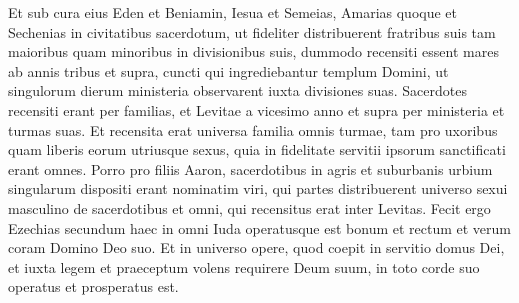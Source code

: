 \begin{biblechapter}
\verse Et sub cura eius Eden et Beniamin, Iesua et Semeias, Amarias quoque et Sechenias in civitatibus sacerdotum, ut fideliter distribuerent fratribus suis tam maioribus quam minoribus in divisionibus suis, 
\verse dummodo recensiti essent mares ab annis tribus et supra, cuncti qui ingrediebantur templum Domini, ut singulorum dierum ministeria observarent iuxta divisiones suas. 
\verse Sacerdotes recensiti erant per familias, et Levitae a vicesimo anno et supra per ministeria et turmas suas. 
\verse Et recensita erat universa familia omnis turmae, tam pro uxoribus quam liberis eorum utriusque sexus, quia in fidelitate servitii ipsorum sanctificati erant omnes. 
\verse Porro pro filiis Aaron, sacerdotibus in agris et suburbanis urbium singularum dispositi erant nominatim viri, qui partes distribuerent universo sexui masculino de sacerdotibus et omni, qui recensitus erat inter Levitas. 
\verse Fecit ergo Ezechias secundum haec in omni Iuda operatusque est bonum et rectum et verum coram Domino Deo suo. 
\verse Et in universo opere, quod coepit in servitio domus Dei, et iuxta legem et praeceptum volens requirere Deum suum, in toto corde suo operatus et prosperatus est. 
\end{biblechapter}

